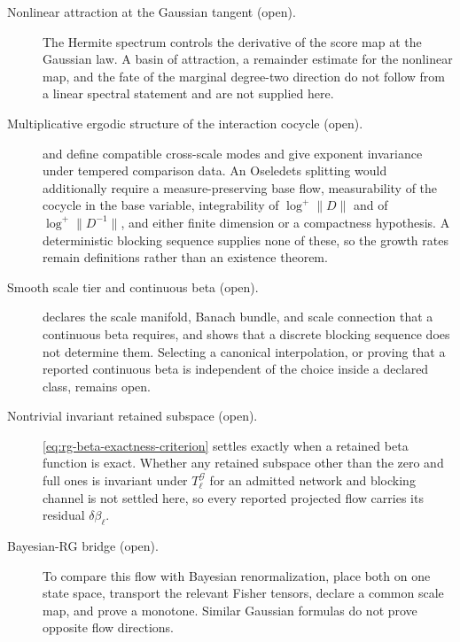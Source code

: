 \begin{description}
\item[Nonlinear attraction at the Gaussian tangent (open).]
The Hermite spectrum controls the derivative of the score map at the Gaussian
law.  A basin of attraction, a remainder estimate for the nonlinear map, and the
fate of the marginal degree-two direction do not follow from a linear spectral
statement and are not supplied here. 

\item[Multiplicative ergodic structure of the interaction cocycle (open).]
 and  define compatible
cross-scale modes and give exponent invariance under tempered comparison data.
An Oseledets splitting would additionally require a measure-preserving base
flow, measurability of the cocycle in the base variable, integrability of
\(\log^+\lVert D\rVert\) and of \(\log^+\lVert D^{-1}\rVert\), and either finite
dimension or a compactness hypothesis.  A deterministic blocking sequence
supplies none of these, so the growth rates remain definitions rather than an
existence theorem. 

\item[Smooth scale tier and continuous beta (open).]
 declares the scale manifold, Banach bundle, and
scale connection that a continuous beta requires, and
 shows that a discrete blocking
sequence does not determine them.  Selecting a canonical interpolation, or
proving that a reported continuous beta is independent of the choice inside a
declared class, remains open. 

\item[Nontrivial invariant retained subspace (open).]
\eqref{eq:rg-beta-exactness-criterion} settles exactly when a retained beta
function is exact.  Whether any retained subspace other than the zero and full
ones is invariant under \(T_\ell^{\mathcal G}\) for an admitted network and
blocking channel is not settled here, so every reported projected flow carries
its residual \(\delta\beta_\ell\). 

\item[Bayesian-RG bridge (open).]
To compare this flow with Bayesian renormalization, place both on one state
space, transport the relevant Fisher tensors, declare a common scale map,
and prove a monotone.  Similar Gaussian formulas do not prove opposite flow
directions. 


\end{description}
